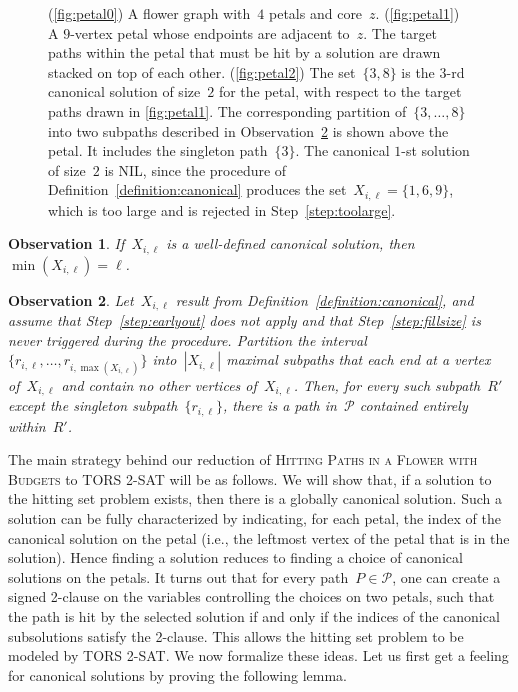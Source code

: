 \let\accentvec\vec  \documentclass{llncs}
\newtheorem{observation}{Observation}
\renewcommand{\P}{\ensuremath{\mathcal{P}}\xspace}
\newcommand{\HitPathsInFlower}{\textsc{Hitting Paths in a Flower with Budgets}\xspace}
\newcommand{\TORSTwoSat}{\textsc{TORS 2-SAT}\xspace}
\begin{document}
\begin{figure}[t]
\begin{center}
\caption{(\ref{fig:petal0}) A flower graph with~$4$ petals and core~$z$. (\ref{fig:petal1}) A $9$-vertex petal whose endpoints are adjacent to~$z$. The target paths within the petal that must be hit by a solution are drawn stacked on top of each other. (\ref{fig:petal2}) The set~$\{3,8\}$ is the $3$-rd canonical solution of size~$2$ for the petal, with respect to the target paths drawn in \ref{fig:petal1}. The corresponding partition of~$\{3,\ldots,8\}$ into two subpaths described in Observation~\ref{observation:partition} is shown above the petal. It includes the singleton path~$\{3\}$. The canonical $1$-st solution of size~$2$ is NIL, since the procedure of Definition~\ref{definition:canonical} produces the set~$X_{i,\ell} = \{1,6,9\}$, which is too large and is rejected in Step~\ref{step:toolarge}.}
\end{center}\label{fig:petals}
\end{figure}

\begin{observation} \label{observation:leftmost}
If~$X_{i,\ell}$ is a well-defined canonical solution, then~$\min(X_{i,\ell}) = \ell$.
\end{observation}

\begin{observation} \label{observation:partition}
Let~$X_{i,\ell}$ result from Definition~\ref{definition:canonical}, and assume that Step~\ref{step:earlyout} does not apply and that Step~\ref{step:fillsize} is never triggered during the procedure. Partition the interval~$\{r_{i,\ell}, \ldots, r_{i,\max(X_{i,\ell})}\}$ into~$|X_{i,\ell}|$ maximal subpaths that each end at a vertex of~$X_{i,\ell}$ and contain no other vertices of~$X_{i,\ell}$. Then, for every such subpath~$R'$ except the singleton subpath~$\{r_{i,\ell}\}$, there is a path in~$\P$ contained entirely within~$R'$.
\end{observation}

The main strategy behind our reduction of \HitPathsInFlower to \TORSTwoSat will be as follows. We will show that, if a solution to the hitting set problem exists, then there is a globally canonical solution. Such a solution can be fully characterized by indicating, for each petal, the index of the canonical solution on the petal (i.e., the leftmost vertex of the petal that is in the solution). Hence finding a solution reduces to finding a choice of canonical solutions on the petals. It turns out that for every path~$P \in \P$, one can create a signed 2-clause on the variables controlling the choices on two petals, such that the path is hit by the selected solution if and only if the indices of the canonical subsolutions satisfy the 2-clause. This allows the hitting set problem to be modeled by \TORSTwoSat. We now formalize these ideas. Let us first get a feeling for canonical solutions by proving the following lemma.
\end{document}
